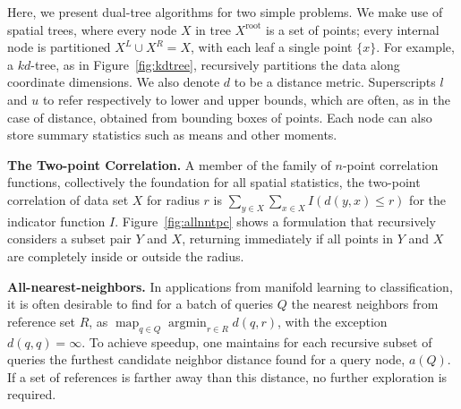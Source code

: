 \documentclass[times, 10pt,twocolumn]{article}
\DeclareMathOperator*{\map}{map}
\DeclareMathOperator*{\argmin}{argmin}
\newcommand{\kdroot}[1]{#1^{\text{root}}}
\newcommand{\kdleft}[1]{#1^{\!L}}
\newcommand{\kdright}[1]{#1^{\!R}}
\begin{document}
Here, we present dual-tree algorithms for two simple problems.
We make use of spatial trees, where every node $X$ in tree $\kdroot{X}$ is a set of points; every internal node is partitioned $\kdleft{X} \cup \kdright{X} = X$, with each leaf a single point $\{x\}$.
For example, a $kd$-tree\cite{kde-uai-dong}, as in Figure~\ref{fig:kdtree}, recursively partitions the data along coordinate dimensions.
We also denote $d$ to be a distance metric.
Superscripts $l$ and $u$ to refer respectively to lower and upper bounds, which are often, as in the case of distance, obtained from bounding boxes of points.
Each node can also store summary statistics such as means and other moments.

{\bf The Two-point Correlation.} A member of the family of $n$-point correlation functions, collectively the foundation for all spatial statistics, the two-point correlation of data set $X$ for radius $r$ is
$\sum_{y \in X} \sum_{x \in X} I(d(y, x) \leq r)$ for the indicator function $I$.
Figure~\ref{fig:allnntpc} shows a formulation that recursively considers a subset pair $Y$ and $X$, returning immediately if all points in $Y$ and $X$ are completely inside or outside the radius.

{\bf All-nearest-neighbors.} In applications from manifold learning to classification, it is often desirable to find for a batch of queries $Q$ the nearest neighbors from reference set $R$, as $\map_{q \in Q} \argmin_{r \in R} d(q,r)$, with the exception $d(q,q) = \infty$.
To achieve speedup, one maintains for each recursive subset of queries the furthest candidate neighbor distance found for a query node, $a(Q)$.
If a set of references is farther away than this distance, no further exploration is required.

\end{document}
